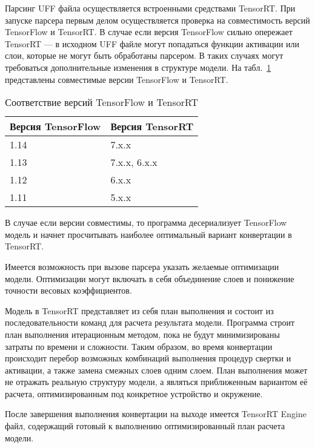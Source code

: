Парсинг UFF файла осуществляется встроенными средствами TensorRT. При запуске парсера первым делом осуществляется проверка на совместимость версий TensorFlow и TensorRT. В случае если версия TensorFlow сильно опережает TensorRT — в исходном UFF файле могут попадаться функции активации или слои, которые не могут быть обработаны парсером. В таких случаях могут требоваться дополнительные изменения в структуре модели. На табл.~\ref{tabular:tab_tf_trt} представлены совместимые версии TensorFlow и TensorRT.

\begin{table}[H]
	\caption{Соответствие версий TensorFlow и TensorRT}
	\begin{center}
		\begin{tabular}{|l|l|}
			\hline
			Версия TensorFlow & Версия TensorRT\\ \hline
			1.14 & 7.x.x\\ \hline
			1.13 & 7.x.x, 6.x.x\\ \hline
			1.12 & 6.x.x\\ \hline
			1.11 & 5.x.x\\ \hline
		\end{tabular}
		\label{tabular:tab_tf_trt}
	\end{center}
\end{table}

В случае если версии совместимы, то программа десериализует TensorFlow модель и начнет просчитывать наиболее оптимальный вариант конвертации в TensorRT. 

Имеется возможность при вызове парсера указать желаемые оптимизации модели. Оптимизации могут включать в себя объединение слоев и понижение точности весовых коэффициентов. 

Модель в TensorRT представляет из себя план выполнения и состоит из последовательности команд для расчета результата модели. Программа строит план выполнения итерационным методом, пока не будут минимизированы затраты по времени и сложности. Таким образом, во время конвертации происходит перебор возможных комбинаций выполнения процедур свертки и активации, а также замена смежных слоев одним слоем. План выполнения может не отражать реальную структуру модели, а являться приближенным вариантом её расчета, оптимизированным под конкретное устройство и окружение. 

После завершения выполнения конвертации на выходе имеется TensorRT Engine файл, содержащий готовый к выполнению оптимизированный план расчета модели.

